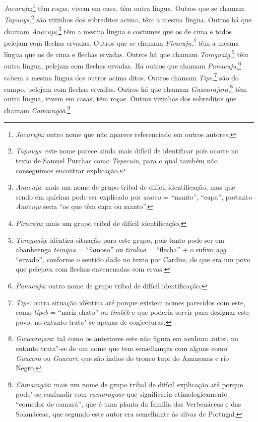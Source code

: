 \textit{Jacuruju};\footnote{ \textit{Jacuruju}: outro nome que não
aparece referenciado em outros autores.} têm roças, vivem em
casa, têm outra língua. Outros que se chamam 
\textit{Tapuuys},\footnote{ \textit{Tapuuys}: este nome parece ainda mais difícil de
identificar pois ocorre no texto de Samuel Purchas como
\textit{Tapecuin}, para o qual também não conseguimos encontrar
explicação.} são vizinhos dos sobreditos acima, têm a mesma
língua. Outros há que chamam \textit{Anacuju},\footnote{ \textit{Anacuju}: mais um nome de grupo tribal de difícil
identificação, mas que sendo em quíchua pode ser explicado por
\textit{anacu} = ``manto'', ``capa'', portanto \textit{Anacuju} seria ``os
que têm capa ou manto''.} têm a mesma língua e costumes que
os de cima e todos pelejam com flechas ervadas. Outros que se chamam
\textit{Piracuju},\footnote{ \textit{Piracuju}: mais um grupo tribal
de difícil identificação.} têm a mesma língua que os de cima e
flechas ervadas. Outros há que chamam \textit{Taraguaig},\footnote{ \textit{Taraguaig}: idêntica situação para este grupo, pois tanto pode
ser em abanheenga \textit{teraqua} = ``famoso'' ou \textit{tirakua} = ``flecha'' + o sufixo \textit{ayg} = ``ervado'', conforme o sentido dado no
texto por Cardim, de que era um povo que pelejava com flechas
envenenadas com ervas.} têm outra língua, pelejam com flechas
ervadas. Há outros que chamam \textit{Panacuju},\footnote{ \textit{Panacuju}: outro nome de grupo tribal de difícil
identificação.} sabem a mesma língua dos outros acima ditos. Outros
chamam \textit{Tipe},\footnote{ \textit{Tipe}: outra situação
idêntica até porque existem nomes parecidos com este, como
\textit{tipeb} = ``nariz chato'' ou \textit{timbêb} e que poderia servir
para designar este povo; no entanto trata"-se apenas de
conjecturas.} são do campo, pelejam com flechas ervadas.
Outros há que chamam \textit{Guacarajara},\footnote{ \textit{Guacarajara}: tal como os anteriores este não figura em nenhum
autor, no entanto trata"-se de um nome que tem semelhanças com alguns
como \textit{Guacara} ou \textit{Guacari}, que são índios do tronco
tupi do Amazonas e rio Negro.} têm outra língua, vivem em
casas, têm roças. Outros vizinhos dos sobreditos que chamam
\textit{Camaragôã}.\footnote{ \textit{Camaragôã}: mais um nome de
grupo tribal de difícil explicação até porque pode"-se confundir com
\textit{camaraguar} que significaria etimologicamente ``comedor de
camará'', que é uma planta da família das Verbenáceas e das Solanáceas,
que segundo este autor era semelhante às silvas de Portugal.} 

